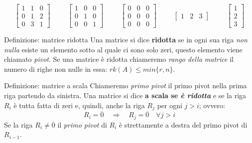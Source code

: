 \documentclass[x11names]{article}
\begin{document}
$$
\begin{bmatrix}1 & 1 & 0 \\ 0 & 1 & 2 \\ 0 & 3 & 1\end{bmatrix}
\hspace{1cm}
\begin{bmatrix}1 & 0 & 0\\0 & 1 & 0\\ 0 & 0 & 1\end{bmatrix}
\hspace{1cm}
\begin{bmatrix}0 & 0 & 0\\0 & 0 & 0\\ 0 & 0 & 0\end{bmatrix}
\hspace{1cm}
\begin{bmatrix}1 & 2 & 3\end{bmatrix}
\hspace{1cm}
\begin{bmatrix}1\\ 2 \\ 3 \end{bmatrix}
$$

\begin{center}
\colorbox{myblue}{\begin{minipage}{5.75in}
\begin{blues}{Definizione: matrice ridotta}
    Una matrice si dice \textbf{ridotta} se in ogni sua riga \textit{non nulla} esiste un elemento sotto al quale ci sono solo zeri, questo elemento viene chiamato \textit{pivot}. Se una matrice è ridotta chiameremo \textit{rango della matrice} il numero di righe non nulle in essa: $rk(A) \leq min\{r,n\}$.
\end{blues}


\begin{blues}{Definizione: matrice a scala}
    Chiameremo \textit{primo pivot} il primo pivot nella prima riga partendo da sinistra. Una matrice si dice \textbf{a scala se \textit{è ridotta}} e se la riga $R_i$ è tutta fatta di zeri e, quindi, anche la riga $R_j$ per ogni $j>i$; ovvero: 
    $$
    R_i = \overline{0}\quad \Rightarrow \quad R_j = \overline{0} \quad \forall j>i
    $$
    Se la riga $R_i \neq \overline{0}$ il \textit{primo pivot} di $R_i$ è strettamente a destra del primo pivot di $R_{i-1}$.
\end{blues}
\end{minipage}}        
\end{center}
\end{document}
